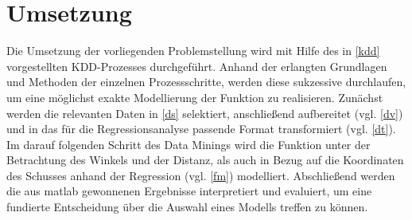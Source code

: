 \chapter{Umsetzung}
\label{umsetzung}

Die Umsetzung der vorliegenden Problemstellung wird mit Hilfe des in \vref{kdd} vorgestellten KDD-Prozesses durchgeführt. Anhand der erlangten Grundlagen und Methoden der einzelnen Prozessschritte, werden diese sukzessive durchlaufen, um eine möglichst exakte Modellierung der Funktion zu realisieren. Zunächst werden die relevanten Daten in \vref{ds} selektiert, anschließend aufbereitet (vgl. \vref{dv}) und in das für die Regressionsanalyse passende Format transformiert (vgl. \vref{dt}). Im darauf folgenden Schritt des Data Minings wird die Funktion unter der Betrachtung des Winkels und der Distanz, als auch in Bezug auf die Koordinaten des Schusses anhand der Regression (vgl. \vref{fm}) modelliert. Abschließend werden die aus \gls{matlab} gewonnenen Ergebnisse interpretiert und evaluiert, um eine fundierte Entscheidung über die Auswahl eines Modells treffen zu können.





